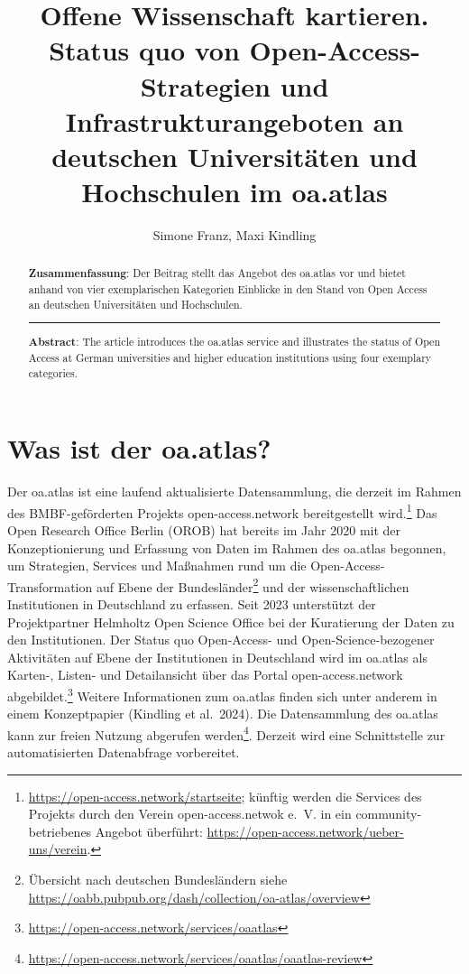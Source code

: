 \documentclass[a4paper,
fontsize=11pt,
oneside,
numbers=noperiodatend,
parskip=half-,
bibliography=totoc,
final
]{scrartcl}
\title{\LARGE{Offene Wissenschaft kartieren. Status quo von Open-Access-Strategien und Infrastrukturangeboten an deutschen Universitäten und Hochschulen im oa.atlas}}%
\author{Simone Franz, Maxi Kindling} %
\date{}
\begin{document}
\maketitle
\thispagestyle{fancyplain} 

\begin{abstract}
\noindent
\textbf{Zusammenfassung}: Der Beitrag stellt das Angebot des oa.atlas
vor und bietet anhand von vier exemplarischen Kategorien Einblicke in
den Stand von Open Access an deutschen Universitäten und Hochschulen.

\begin{center}\rule{0.5\linewidth}{0.5pt}\end{center}

\noindent
\textbf{Abstract}: The article introduces the oa.atlas service and
illustrates the status of Open Access at German universities and higher
education institutions using four exemplary categories.
\end{abstract}

\section{Was ist der oa.atlas?}\label{was-ist-der-oa.atlas}

Der oa.atlas ist eine laufend aktualisierte Datensammlung, die derzeit
im Rahmen des BMBF-geförderten Projekts open-access.network
bereitgestellt wird.\footnote{\url{https://open-access.network/startseite};
  künftig werden die Services des Projekts durch den Verein
  open-access.netwok e.~V. in ein community-betriebenes Angebot
  überführt: \url{https://open-access.network/ueber-uns/verein}.} Das
Open Research Office Berlin (OROB) hat bereits im Jahr 2020 mit der
Konzeptionierung und Erfassung von Daten im Rahmen des oa.atlas
begonnen, um Strategien, Services und Maßnahmen rund um die
Open-Access-Transformation auf Ebene der Bundesländer\footnote{Übersicht
  nach deutschen Bundesländern siehe
  \url{https://oabb.pubpub.org/dash/collection/oa-atlas/overview}} und
der wissenschaftlichen Institutionen in Deutschland zu erfassen. Seit
2023 unterstützt der Projektpartner Helmholtz Open Science Office bei
der Kuratierung der Daten zu den Institutionen. Der Status quo
Open-Access- und Open-Science-bezogener Aktivitäten auf Ebene der
Institutionen in Deutschland wird im oa.atlas als Karten-, Listen- und
Detailansicht über das Portal open-access.network abgebildet.\footnote{\url{https://open-access.network/services/oaatlas}}
Weitere Informationen zum oa.atlas finden sich unter anderem in einem
Konzeptpapier (Kindling et al.~2024). Die Datensammlung des oa.atlas
kann zur freien Nutzung abgerufen werden\footnote{\url{https://open-access.network/services/oaatlas/oaatlas-review}}.
Derzeit wird eine Schnittstelle zur automatisierten Datenabfrage
vorbereitet.
\end{document}
